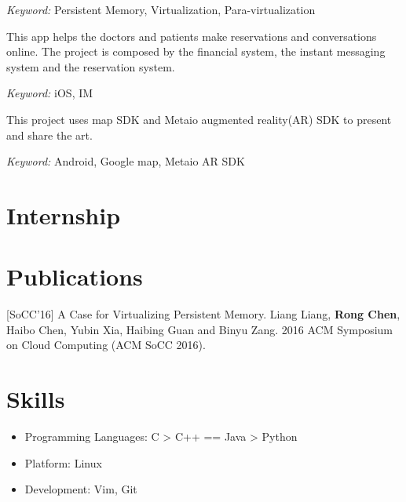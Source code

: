 \documentclass{resume}
\begin{document}
\textit{Keyword: } Persistent Memory, Virtualization, Para-virtualization



This app helps the doctors and patients make reservations and conversations online. 
The project is composed by the financial system, the instant messaging system and the reservation system.

\textit{Keyword: } iOS, IM

This project uses map SDK and Metaio augmented reality(AR) SDK to present and share the art. 

\textit{Keyword: } Android, Google map, Metaio AR SDK


\section{Internship}

\section{Publications}
[SoCC'16] A Case for Virtualizing Persistent Memory. Liang Liang, \textbf{Rong Chen}, Haibo Chen, Yubin Xia, Haibing Guan and Binyu Zang. 2016 ACM Symposium on Cloud Computing (ACM SoCC 2016).


\section{Skills}
\begin{itemize}[parsep=0.5ex]
  \item Programming Languages: C > C++ == Java > Python
  \item Platform: Linux
  \item Development: Vim, Git
\end{itemize}

\end{document}
